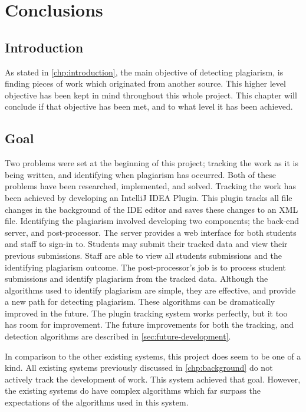 \chapter{Conclusions}
\section{Introduction}
As stated in \autoref{chp:introduction}, the main objective of detecting plagiarism, is finding pieces of work which originated from another source. This higher level objective has been kept in mind throughout this whole project. This chapter will conclude if that objective has been met, and to what level it has been achieved.

\section{Goal}
Two problems were set at the beginning of this project; tracking the work as it is being written, and identifying when plagiarism has occurred. Both of these problems have been researched, implemented, and solved. Tracking the work has been achieved by developing an IntelliJ IDEA Plugin. This plugin tracks all file changes in the background of the IDE editor and saves these changes to an XML file. Identifying the plagiarism involved developing two components; the back-end server, and post-processor. The server provides a web interface for both students and staff to sign-in to. Students may submit their tracked data and view their previous submissions. Staff are able to view all students submissions and the identifying plagiarism outcome. The post-processor's job is to process student submissions and identify plagiarism from the tracked data. Although the algorithms used to identify plagiarism are simple, they are effective, and provide a new path for detecting plagiarism. These algorithms can be dramatically improved in the future. The plugin tracking system works perfectly, but it too has room for improvement. The future improvements for both the tracking, and detection algorithms are described in \autoref{sec:future-development}.

In comparison to the other existing systems, this project does seem to be one of a kind. All existing systems previously discussed in \autoref{chp:background} do not actively track the development of work. This system achieved that goal. However, the existing systems do have complex algorithms which far surpass the expectations of the algorithms used in this system.

